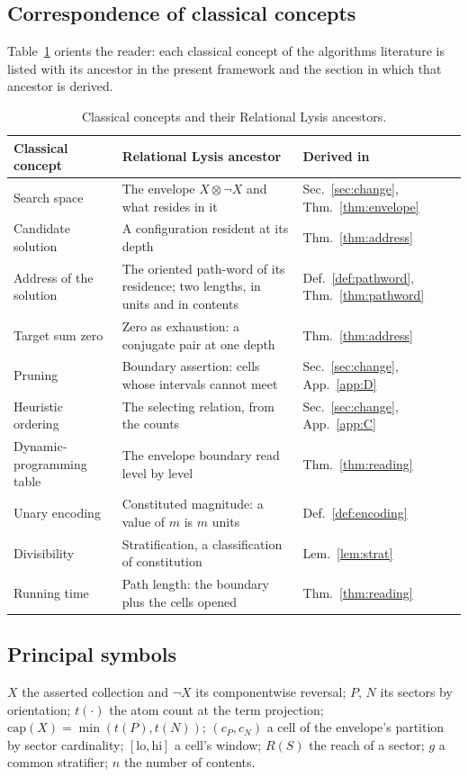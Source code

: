 \documentclass[pdflatex,sn-mathphys-num]{sn-jnl}
\theoremstyle{thmstyleone}%
\theoremstyle{thmstyletwo}%
\theoremstyle{thmstylethree}%
\begin{document}
\subsection*{Correspondence of classical concepts}
Table~\ref{tab:corr} orients the reader: each classical concept of the algorithms literature is listed with its ancestor in the present framework and the section in which that ancestor is derived.
\begin{table}[!htbp]
\centering\small
\caption{Classical concepts and their Relational Lysis ancestors.}\label{tab:corr}
\begin{tabularx}{\textwidth}{l >{\raggedright\arraybackslash}X l}
\toprule
Classical concept & Relational Lysis ancestor & Derived in \\
\midrule
Search space & The envelope $X\otimes\neg X$ and what resides in it & Sec.~\ref{sec:change}, Thm.~\ref{thm:envelope} \\
Candidate solution & A configuration resident at its depth & Thm.~\ref{thm:address} \\
Address of the solution & The oriented path-word of its residence; two lengths, in units and in contents & Def.~\ref{def:pathword}, Thm.~\ref{thm:pathword} \\
Target sum zero & Zero as exhaustion: a conjugate pair at one depth & Thm.~\ref{thm:address} \\
Pruning & Boundary assertion: cells whose intervals cannot meet & Sec.~\ref{sec:change}, App.~\ref{app:D} \\
Heuristic ordering & The selecting relation, from the counts & Sec.~\ref{sec:change}, App.~\ref{app:C} \\
Dynamic-programming table & The envelope boundary read level by level & Thm.~\ref{thm:reading} \\
Unary encoding & Constituted magnitude: a value of $m$ is $m$ units & Def.~\ref{def:encoding} \\
Divisibility & Stratification, a classification of constitution & Lem.~\ref{lem:strat} \\
Running time & Path length: the boundary plus the cells opened & Thm.~\ref{thm:reading} \\
\bottomrule
\end{tabularx}
\end{table}

\subsection*{Principal symbols}
$X$ the asserted collection and $\neg X$ its componentwise reversal; $P$, $N$ its sectors by orientation; $t(\cdot)$ the atom count at the term projection; $\mathrm{cap}(X)=\min(t(P),t(N))$; $(c_P,c_N)$ a cell of the envelope's partition by sector cardinality; $[\mathrm{lo},\mathrm{hi}]$ a cell's window; $R(S)$ the reach of a sector; $g$ a common stratifier; $n$ the number of contents.
\end{document}
